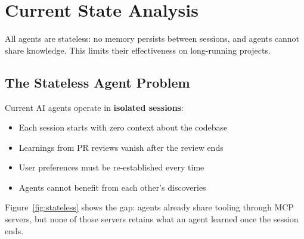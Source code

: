 \documentclass[11pt,letterpaper]{article}
\begin{document}
\section{Current State Analysis}

\begin{tldrbox}
All agents are stateless: no memory persists between sessions, and agents cannot share knowledge. This limits their effectiveness on long-running projects.
\end{tldrbox}

\subsection{The Stateless Agent Problem}

\begin{keybox}
Current AI agents operate in \textbf{isolated sessions}:
\begin{itemize}
  \item Each session starts with zero context about the codebase
  \item Learnings from PR reviews vanish after the review ends
  \item User preferences must be re-established every time
  \item Agents cannot benefit from each other's discoveries
\end{itemize}
\end{keybox}

Figure~\ref{fig:stateless} shows the gap: agents already share tooling through MCP servers, but none of those servers retains what an agent learned once the session ends.
\end{document}
